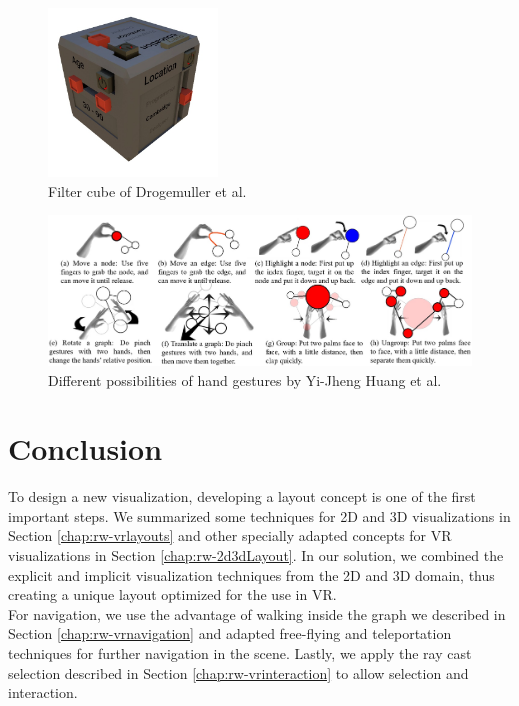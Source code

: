 \begin{figure}[h]
    \centering
    \includegraphics[width=0.4\textwidth]{graphics/filterCube.jpg}
    \caption{Filter cube of Drogemuller et al. \cite{drogemuller_vrige_2017}} 
    \label{fig:vrFilterCube} 
\end{figure}

\begin{figure}[h]
    \centering
    \includegraphics[width=1\textwidth]{graphics/handGestures.jpg}
    \caption{Different possibilities of hand gestures by Yi-Jheng Huang et al. \cite{yi-jheng_huang_gesture_2017}} 
    \label{fig:vrHandGestures} 
\end{figure}

\section{Conclusion}

To design a new visualization, developing a layout concept is one of the first important steps. We summarized some techniques for 2D and 3D visualizations in Section \ref{chap:rw-vrlayouts} and other specially adapted concepts for VR visualizations in Section \ref{chap:rw-2d3dLayout}. In our solution, we combined the explicit and implicit visualization techniques from the 2D and 3D domain, thus creating a unique layout optimized for the use in VR.\\
For navigation, we use the advantage of walking inside the graph we described in Section \ref{chap:rw-vrnavigation} and adapted free-flying and teleportation techniques for further navigation in the scene. Lastly, we apply the ray cast selection described in Section \ref{chap:rw-vrinteraction} to allow selection and interaction.  